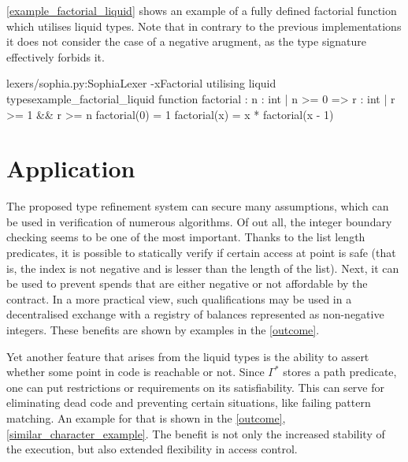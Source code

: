 \autoref{example_factorial_liquid} shows an example of a fully defined factorial
function which utilises liquid types. Note that in contrary to the previous
implementations it does not consider the case of a negative arugment, as the
type signature effectively forbids it.

\begin{code}[h]{lexers/sophia.py:SophiaLexer -x}{Factorial utilising liquid
    types}{example_factorial_liquid}
function
  factorial : {n : int | n >= 0} => {r : int | r >= 1 && r >= n}
  factorial(0) = 1
  factorial(x) = x * factorial(x - 1)
\end{code}

\section{Application}

The proposed type refinement system can secure many assumptions, which can be
used in verification of numerous algorithms. Of out all, the integer boundary
checking seems to be one of the most important. Thanks to the list length
predicates, it is possible to statically verify if certain access at point is
safe (that is, the index is not negative and is lesser than the length of the
list). Next, it can be used to prevent spends that are either negative or not
affordable by the contract. In a more practical view, such qualifications may be
used in a decentralised exchange with a registry of balances represented as
non-negative integers. These benefits are shown by examples in the
\autoref{outcome}.

Yet another feature that arises from the liquid types is the ability to assert
whether some point in code is reachable or not. Since $\Gamma^*$ stores a path
predicate, one can put restrictions or requirements on its satisfiability. This
can serve for eliminating dead code and preventing certain situations, like
failing pattern matching. An example for that is shown in the \autoref{outcome},
\autoref{similar_character_example}. The benefit is not only the increased
stability of the execution, but also extended flexibility in access control.
